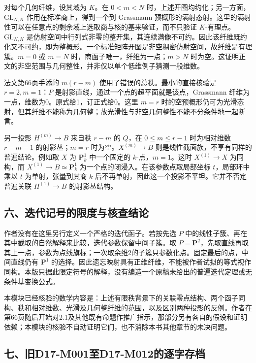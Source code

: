 对每个几何纤维，设其域为 $K$。在 $0<m<N$ 时，上述开图均约化；另一方面，$\mathrm{GL}_{N,K}$ 作用在标准商上，得到一个到 Grassmann 预概形的满射态射。这里的满射性可以在任意点的剩余域上选取商与核的基来验证，而不只验证 $K$-有理点。$\mathrm{GL}_{N,K}$ 是仿射空间中行列式非零的整开集，其连续满像不可约。因此该纤维既约化又不可约，即为整概形。一个标准矩阵开图是非空稠密仿射空间，故纤维是有理簇。$m=0$ 或 $m=N$ 时，商函子唯一，纤维为一点；$m>N$ 时为空。这证明正文的非空范围与几何整性，并非仅以单个低维例子猜测一般维数。

法文第66页手添的 $m(r-m)$ 使用了错误的总秩。最小的直接核验是 $r=2,m=1$：$P$ 是射影直线，通过一个点的超平面就是该点，Grassmann 纤维为一点，维数为0。原式给1，订正式给0。这里 $m=r$ 时的空预概形仍可为光滑态射，但其纤维不能称为几何整；故光滑性与非空几何整性不能不分条件地一起断言。

另一投影 $H^{(m)}\to B$ 来自秩 $r-m$ 的 $Q$，在 $0\leq m\leq r-1$ 时为相对维数 $r-m-1$ 的射影丛；$m=r$ 时为空。$X^{(m)}\to B$ 则是线性截面族，不享有同样的普遍结论。例如取 $X$ 为 $\mathbf P^1_k$ 中一个固定的 $k$-点，$m=1$。这时 $X^{(1)}\to X$ 为同构，而 $X^{(1)}\to B\simeq\mathbf P^1_k$ 为一个点的闭浸入。在该参数点取局部坐标 $t$，局部环中乘以 $t$ 为单射，张量到其商 $k$ 后不再单射，因此这一个投影不平坦。它并不否定普遍关联 $H^{(1)}\to B$ 的射影丛结构。

\subsection*{六、迭代记号的限度与核查结论}

作者没有在这里另行定义一个严格的迭代函子。若按先选 $P$ 中的线性子簇、再在其中截取的自然解释来比较，迭代参数保留中间子簇。取 $P=\mathbf P^2$，先取直线再取其上一点，参数为点线旗标；一次取余维2的子簇只参数化点。固定最后的点，中间直线仍有 $\mathbf P^1$ 的选择。因此遗忘映射具有正维纤维，不能被作者试拟的等式视作同构。本版只据此限定符号的解释，没有编造一个原稿未给出的普遍迭代定理或无条件基变换公式。

本模块已经核验的数学内容是：上述有限秩背景下的关联零点结构、两个函子同构、秩和相对维数、光滑及几何整纤维的范围，以及区别两种投影的反例。作者在第66页随后开始对2.1及其他既有命题作推广指示，那部分另有各自的假设和证明依赖；本模块的核验不自动证明它们，也不消除本书其他章节的未决问题。

\subsection*{七、旧D17-M001至D17-M012的逐字存档}

